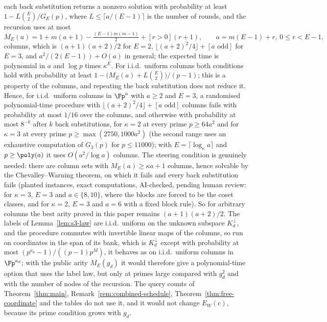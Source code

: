 \begin{remark}
each back substitution returns a nonzero solution with probability at least $1-L\binom{E}{2}/G_E(p)$, where $L\le\lceil a/(E-1)\rceil$ is the number of rounds, and the recursion uses at most
\[
  M_E(a)=1+m(a+1)-\tfrac{(E-1)m(m-1)}{2}+[r>0](r+1),\qquad a=m(E-1)+r,\ 0\le r<E-1,
\]
columns, which is $(a+1)(a+2)/2$ for $E=2$, $\lfloor(a+2)^2/4\rfloor+[a\text{ odd}]$ for $E=3$, and $a^2/(2(E-1))+O(a)$ in general; the expected time is polynomial in $a$ and $\log p$ times $\kappa^E$. For i.i.d.\ uniform columns both conditions hold with probability at least $1-\bigl(M_E(a)+L\binom{E}{2}\bigr)/(p-1)$; this is a property of the columns, and repeating the back substitution does not reduce it. Hence, for i.i.d.\ uniform columns in $\Fp^a$ with $a\ge2$ and $E=3$, a randomised polynomial-time procedure with $\lfloor(a+2)^2/4\rfloor+[a\text{ odd}]$ columns fails with probability at most $1/16$ over the columns, and otherwise with probability at most $8^{-k}$ after $k$ back substitutions, for $\kappa=2$ at every prime $p\ge64a^2$ and for $\kappa=3$ at every prime $p\ge\max(2750,1000a^2)$ (the second range uses an exhaustive computation of $G_3(p)$ for $p\le11000$); with $E=\lceil\log_\kappa a\rceil$ and $p\ge\poly(a)$ it uses $O(a^2/\log a)$ columns. The steering condition is genuinely needed: there are column sets with $M_E(a)\ge\kappa a+1$ columns, hence solvable by the Chevalley--Warning theorem, on which it fails and every back substitution fails (planted instances, exact computations, AI-checked, pending human review: for $\kappa=3$, $E=3$ and $a\in\{8,10\}$, where the blocks are forced to be the coset classes, and for $\kappa=2$, $E=3$ and $a=6$ with a fixed block rule). So for arbitrary columns the best arity proved in this paper remains $(a+1)(a+2)/2$. The labels of Lemma~\ref{lem:s3-law} are i.i.d.\ uniform on the unknown subspace $K_d^\perp$, and the procedure commutes with invertible linear maps of the columns, so run on coordinates in the span of its bank, which is $K_d^\perp$ except with probability at most $(p^{a_d}-1)/((p-1)p^{M})$, it behaves as on i.i.d.\ uniform columns in $\Fp^{a_d}$; with the public arity $M_E(g_d)$ it would therefore give a polynomial-time option that uses the label law, but only at primes large compared with $g_d^2$ and with the number of nodes of the recursion. The query counts of Theorem~\ref{thm:main}, Remark~\ref{rem:combined-schedule}, Theorem~\ref{thm:free-coordinate} and the tables do not use it, and it would not change $E_W(c)$, because its prime condition grows with $g_d$.
\end{remark}
